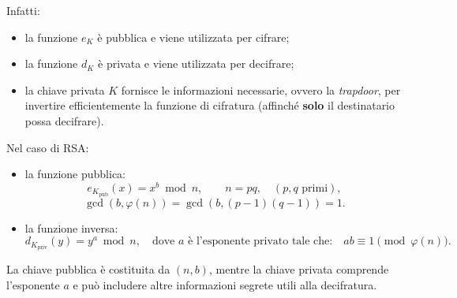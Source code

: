 \vspace{1em}Infatti:
\begin{itemize}
    \item la funzione $e_K$ è pubblica e viene utilizzata per cifrare;
    \item la funzione $d_K$ è privata e viene utilizzata per decifrare;
    \item la chiave privata $K$ fornisce le informazioni necessarie, ovvero la \textit{trapdoor},
    per invertire efficientemente la funzione di cifratura (affinché \textbf{solo} il destinatario possa decifrare).
\end{itemize}


\newpage
Nel caso di RSA:
\begin{itemize}
    \item la funzione pubblica:
        \[
            e_{K_{\text{pub}}}(x)=x^b \bmod n, \qquad n=pq, \quad (\text{$p,q$ primi}),
        \]
        \[
            \gcd(b,\varphi(n))=\gcd(b, (p-1)(q-1))=1.
        \]
    \item la funzione inversa:
        \[
            d_{K_{\text{priv}}}(y)=y^a \bmod n, \quad \text{dove $a$ è l'esponente privato tale che:} \quad ab \equiv 1 \pmod{\varphi(n)}.
        \]
\end{itemize}

La chiave pubblica è costituita da $(n,b)$, mentre la chiave
privata comprende l'esponente $a$ e può includere altre
informazioni segrete utili alla decifratura.